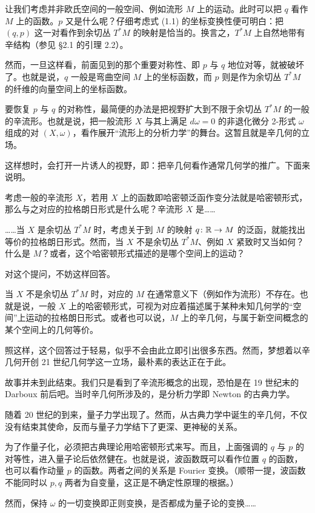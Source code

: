 让我们考虑并非欧氏空间的一般空间、例如流形 $M$ 上的运动。此时可以把 $q$ 看作 $M$ 上的函数。$p$ 又是什么呢？仔细考虑式 (1.1) 的坐标变换性便可明白：把 $(q,p)$ 这一对看作到余切丛 $T^*M$ 的映射是恰当的。换言之，$T^*M$ 上自然地带有辛结构（参见 §2.1 的引理 2.2）。

然而，一旦这样看，前面见到的那个重要对称性、即 $p$ 与 $q$ 地位对等，就被破坏了。也就是说，$q$ 一般是弯曲空间 $M$ 上的坐标函数，而 $p$ 则是作为余切丛 $T^*M$ 的纤维的向量空间上的坐标函数。

要恢复 $p$ 与 $q$ 的对称性，最简便的办法是把视野扩大到不限于余切丛 $T^*M$ 的一般的辛流形。也就是说，把一般流形 $X$ 与其上满足 $d\omega=0$ 的非退化微分 2-形式 $\omega$ 组成的对 $(X,\omega)$，看作展开“流形上的分析力学”的舞台。这暂且就是辛几何的立场。

这样想时，会打开一片诱人的视野，即：把辛几何看作通常几何学的推广。下面来说明。

考虑一般的辛流形 $X$，若用 $X$ 上的函数即哈密顿泛函作变分法就是哈密顿形式，那么与之对应的拉格朗日形式是什么呢？辛流形 $X$ 是……

……当 $X$ 是余切丛 $T^*M$ 时，考虑关于到 $M$ 的映射 $q\colon\mathbb{R}\to M$ 的泛函，就能找出等价的拉格朗日形式。然而，当 $X$ 不是余切丛 $T^*M$、例如 $X$ 紧致时又当如何？什么是 $M$？或者，这个哈密顿形式描述的是哪个空间上的运动？

对这个提问，不妨这样回答。

当 $X$ 不是余切丛 $T^*M$ 时，对应的 $M$ 在通常意义下（例如作为流形）不存在。也就是说，一般 $X$ 上的哈密顿形式，可视为对应着描述属于某种未知几何学的“空间”上运动的拉格朗日形式。或者也可以说，$M$ 上的辛几何，与属于新空间概念的某个空间上的几何等价。

照这样，这个回答过于轻易，似乎不会由此立即引出很多东西。然而，梦想着以辛几何开创 21 世纪几何学这一立场，最朴素的表达正在于此。

故事并未到此结束。我们只是看到了辛流形概念的出现，恐怕是在 19 世纪末的 Darboux 前后吧。当时辛几何所涉及的，是分析力学即 Newton 的古典力学。

随着 20 世纪的到来，量子力学出现了。然而，从古典力学中诞生的辛几何，不仅没有结束其使命，反而与量子力学结下了更深、更神秘的关系。

为了作量子化，必须把古典理论用哈密顿形式来写。而且，上面强调的 $q$ 与 $p$ 的对等性，进入量子论后依然健在。也就是说，波函数既可以看作位置 $q$ 的函数，也可以看作动量 $p$ 的函数。两者之间的关系是 Fourier 变换。（顺带一提，波函数不能同时以 $p,q$ 两者为自变量，这正是不确定性原理的根据。）

然而，保持 $\omega$ 的一切变换即正则变换，是否都成为量子论的变换……

